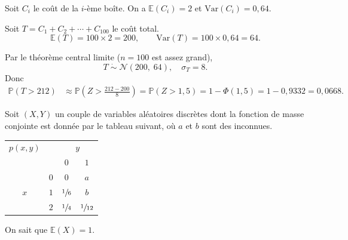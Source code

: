 \begin{questions}
\begin{parts}
    \begin{solution}
    Soit $C_i$ le coût de la $i$-ème boîte. On a $\mathbb{E}(C_i)=2$ et $\text{Var}(C_i)=0{,}64$.

    Soit $T = C_1 + C_2 + \cdots + C_{100}$ le coût total.
    \[
    \mathbb{E}(T) = 100 \times 2 = 200, \qquad
    \text{Var}(T) = 100 \times 0{,}64 = 64.
    \]

    Par le théorème central limite ($n=100$ est assez grand),
    \[
    T \;\dot\sim\; \mathcal{N}(200,\;64), \quad \sigma_T = 8.
    \]
    Donc
    \begin{align*}
    \mathbb{P}(T > 212)
    &\approx \mathbb{P}\!\left(Z > \frac{212 - 200}{8}\right)
    = \mathbb{P}(Z > 1{,}5)
    = 1 - \Phi(1{,}5)
    = 1 - 0{,}9332
    = 0{,}0668.
    \end{align*}
    \end{solution}
\end{parts}



\pageblanche

\question[] Soit $(X, Y)$ un couple de variables aléatoires discrètes dont la fonction de masse conjointe est donnée par le tableau suivant, où $a$ et $b$ sont des inconnues.

\begin{center}
\begin{tabular}{cc|cc}
$p(x,y)$ & & \multicolumn{2}{c}{$y$} \\
 & & $0$ & $1$  \\
\hline
 & $0$ & $0$ & $a$  \\
$x$ & $1$ & $\sfrac{1}{6}$ & $b$  \\
 & $2$ & $\sfrac{1}{4}$ & $\sfrac{1}{12}$  \\
\end{tabular}
\end{center}

On sait que $\mathbb{E}(X)=1$.

\end{questions}
